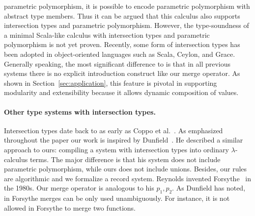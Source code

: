 parametric polymorphism, it is possible to encode parametric
polymorphism with abstract type members. Thus it can be argued that
this calculus also supports intersection types and parametric
polymorphism. However, the type-soundness of a minimal Scala-like
calculus with intersection types and parametric polymorphism is not
yet proven. Recently, some form of intersection
types has been adopted in object-oriented languages such as Scala,
Ceylon, and Grace. Generally speaking,
the most significant difference to \name is that in all previous systems
there is no explicit introduction construct like our merge operator. As shown in
Section~\ref{sec:application}, this feature is pivotal in supporting modularity
and extensibility because it allows dynamic composition of values.

\begin{comment}
only allow intersections of concrete types (classes),
whereas our language allows intersections of type variables, such as
\texttt{A \& B}. Without that vehicle, we would not be able to define
the generic \texttt{merge} function (below) for all interpretations of
a given algebra, and would incur boilerplate code:

\begin{lstlisting}{language=haskell}
let merge [A, B] (f: ExpAlg A) (g: ExpAlg B) = {
  lit (x : Int) = f.lit x ,, g.lit x,
  add (x : A & B) (y : A & B) =
    f.add x y ,, g.add x y
}
\end{lstlisting}
\end{comment}


\paragraph{Other type systems with intersection types.}
Intersection types date back to as early as Coppo et
al.~\cite{coppo1981functional}. As emphasized throughout the paper our
work is inspired by Dunfield~\cite{dunfield2014elaborating}. He described a similar approach to ours:
compiling a system with intersection types into ordinary $ \lambda $-calculus
terms. The major difference is that his system does not include parametric
polymorphism, while ours does not include unions. Besides, our rules are
algorithmic and we formalize a record system.
Reynolds invented Forsythe~\cite{reynolds1997design} in the 1980s. Our merge
operator is analogous to his $ p_1, p_2 $. As Dunfield
has noted, in Forsythe merges can be only used unambiguously.
For instance, it is not allowed in Forsythe to merge two functions.

